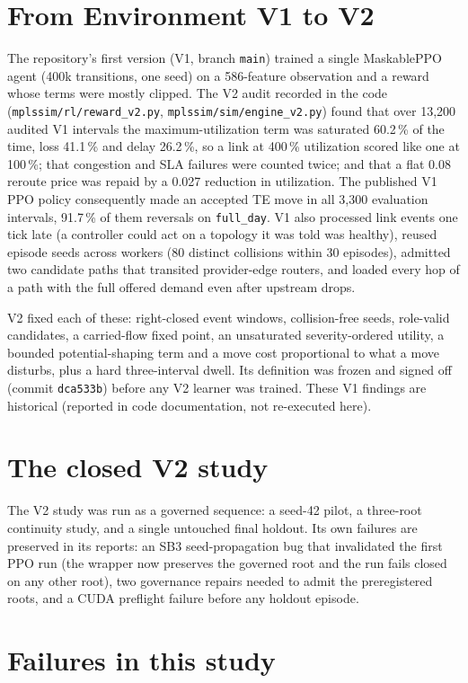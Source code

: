 \section{From Environment V1 to V2}
The repository's first version (V1, branch \texttt{main}) trained a single
MaskablePPO agent (400k transitions, one seed) on a 586-feature observation and
a reward whose terms were mostly clipped. The V2 audit recorded in the code
(\texttt{mplssim/rl/reward\_v2.py}, \texttt{mplssim/sim/engine\_v2.py}) found
that over 13{,}200 audited V1 intervals the maximum-utilization term was
saturated 60.2\,\% of the time, loss 41.1\,\% and delay 26.2\,\%, so a link at
400\,\% utilization scored like one at 100\,\%; that congestion and SLA failures
were counted twice; and that a flat 0.08 reroute price was repaid by a
0.027 reduction in utilization. The published V1 PPO policy consequently made
an accepted TE move in all 3{,}300 evaluation intervals, 91.7\,\% of them
reversals on \texttt{full\_day}. V1 also processed link events one tick late
(a controller could act on a topology it was told was healthy), reused episode
seeds across workers (80 distinct collisions within 30 episodes), admitted two
candidate paths that transited provider-edge routers, and loaded every hop of
a path with the full offered demand even after upstream drops.

V2 fixed each of these: right-closed event windows, collision-free seeds,
role-valid candidates, a carried-flow fixed point, an unsaturated
severity-ordered utility, a bounded potential-shaping term and a move cost
proportional to what a move disturbs, plus a hard three-interval dwell. Its
definition was frozen and signed off (commit \texttt{dca533b}) before any V2
learner was trained. These V1 findings are historical (reported in code
documentation, not re-executed here).

\section{The closed V2 study}
The V2 study was run as a governed sequence: a seed-42 pilot, a three-root
continuity study, and a single untouched final holdout. Its own failures are
preserved in its reports: an SB3 seed-propagation bug that invalidated the
first PPO run (the wrapper now preserves the governed root and the run fails
closed on any other root), two governance repairs needed to admit the
preregistered roots, and a CUDA preflight failure before any holdout episode.

\section{Failures in this study}
{\sloppy}
